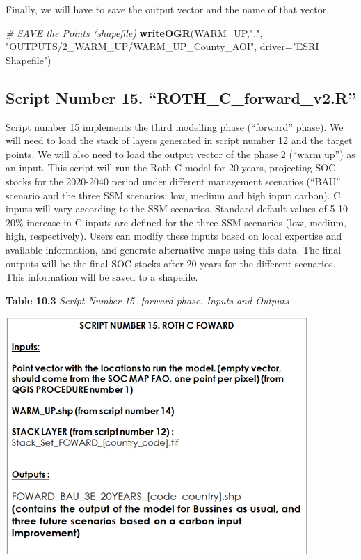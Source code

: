 \documentclass[
  10pt,
  b5paper,
]{book}
\newenvironment{Shaded}{\begin{snugshade}}{\end{snugshade}}
\newcommand{\CommentTok}[1]{\textcolor[rgb]{0.56,0.35,0.01}{\textit{#1}}}
\newcommand{\DataTypeTok}[1]{\textcolor[rgb]{0.13,0.29,0.53}{#1}}
\newcommand{\KeywordTok}[1]{\textcolor[rgb]{0.13,0.29,0.53}{\textbf{#1}}}
\newcommand{\NormalTok}[1]{#1}
\newcommand{\StringTok}[1]{\textcolor[rgb]{0.31,0.60,0.02}{#1}}
\begin{document}
Finally, we will have to save the output vector and the name of that vector.

\begin{Shaded}
\begin{Highlighting}[]
 \CommentTok{# SAVE the Points (shapefile) }
\KeywordTok{writeOGR}\NormalTok{(WARM_UP,}\StringTok{"."}\NormalTok{, }\StringTok{"OUTPUTS/2_WARM_UP/WARM_UP_County_AOI"}\NormalTok{, }\DataTypeTok{driver=}\StringTok{"ESRI Shapefile"}\NormalTok{)}
\end{Highlighting}
\end{Shaded}

\hypertarget{script-number-15.-roth_c_forward_v2.r}{%
\subsection{Script Number 15. ``ROTH\_C\_forward\_v2.R''}\label{script-number-15.-roth_c_forward_v2.r}}

Script number 15 implements the third modelling phase (``forward'' phase). We will need to load the stack of layers generated in script number 12 and the target points. We will also need to load the output vector of the phase 2 (``warm up'') as an input. This script will run the Roth C model for 20 years, projecting SOC stocks for the 2020-2040 period under different management scenarios (``BAU'' scenario and the three SSM scenarios: low, medium and high input carbon). C inputs will vary according to the SSM scenarios. Standard default values of 5-10-20\% increase in C inputs are defined for the three SSM scenarios (low, medium, high, respectively). Users can modify these inputs based on local expertise and available information, and generate alternative maps using this data. The final outputs will be the final SOC stocks after 20 years for the different scenarios. This information will be saved to a shapefile.

\textbf{Table 10.3} \emph{Script Number 15. forward phase. Inputs and Outputs}

\includegraphics{tables/Table_10.3.png}
\end{document}
